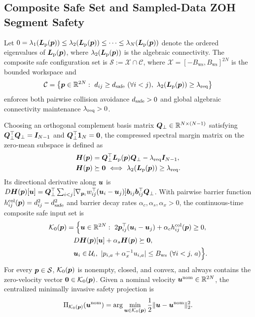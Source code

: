 \subsection{Composite Safe Set and Sampled-Data ZOH Segment Safety}
Let $0=\lambda_1(\boldsymbol{L}_{\mathrm{p}}(\boldsymbol{p}))\le\lambda_2(\boldsymbol{L}_{\mathrm{p}}(\boldsymbol{p}))\le\cdots\le\lambda_N(\boldsymbol{L}_{\mathrm{p}}(\boldsymbol{p}))$ denote the ordered eigenvalues of $\boldsymbol{L}_{\mathrm{p}}(\boldsymbol{p})$, where $\lambda_2(\boldsymbol{L}_{\mathrm{p}}(\boldsymbol{p}))$ is the algebraic connectivity. The composite safe configuration set is $\mathcal S:=\mathcal X\cap\mathcal C$, where $\mathcal X=[-B_{\mathrm{ws}},B_{\mathrm{ws}}]^{2N}$ is the bounded workspace and
\begin{equation}
 \mathcal C=\big\{\bp\in\mathbb R^{2N}:\ d_{ij}\ge\ds\ (\forall i<j),\ \lambda_2(\bL(\bp))\ge\lr\big\}
 \label{eq:safe-set}
\end{equation}
enforces both pairwise collision avoidance $d_{\mathrm{safe}}>0$ and global algebraic connectivity maintenance $\lambda_{\mathrm{req}}>0$.

Choosing an orthogonal complement basis matrix $\boldsymbol{Q}_\perp\in\mathbb R^{N\times(N-1)}$ satisfying $\boldsymbol{Q}_\perp^{\top}\boldsymbol{Q}_\perp=\boldsymbol{I}_{N-1}$ and $\boldsymbol{Q}_\perp^{\top}\boldsymbol 1_N=\boldsymbol 0$, the compressed spectral margin matrix on the zero-mean subspace is defined as
\begin{equation}
\begin{split}
 \bH(\bp)&=\bQ^{\top}\bL(\bp)\bQ-\lr\I_{N-1},\\
 \bH(\bp)&\succeq\boldsymbol 0\ \Longleftrightarrow\ \lambda_2(\bL(\bp))\ge\lr.
\end{split}\label{eq:H-matrix}
\end{equation}
Its directional derivative along $\boldsymbol{u}$ is $D\boldsymbol{H}(\boldsymbol{p})[\boldsymbol{u}]=\boldsymbol{Q}_\perp^{\top}\sum_{i<j}[\nabla_{\boldsymbol{p}_i}w_{ij}^{\top}(\boldsymbol{u}_i-\boldsymbol{u}_j)]\boldsymbol b_{ij}\boldsymbol b_{ij}^{\top}\boldsymbol{Q}_\perp$. With pairwise barrier function $h_{ij}^{\mathrm{col}}(\boldsymbol{p})=d_{ij}^2-d_{\mathrm{safe}}^2$ and barrier decay rates $\alpha_c,\alpha_s,\alpha_x>0$, the continuous-time composite safe input set is
\begin{equation}
\begin{split}
 \mathcal K_0(\bp)&=\Big\{\bu\in\mathbb R^{2N}:\ 2\bp_{ij}^{\top}(\bu_i-\bu_j)+\alpha_c h_{ij}^{\mathrm{col}}(\bp)\ge 0,\\
 &\quad D\bH(\bp)[\bu]+\alpha_s\bH(\bp)\succeq\boldsymbol 0,\\
 &\quad \bu_i\in\mathcal U_i,\ |p_{i,a}+\alpha_x^{-1}u_{i,a}|\le B_{\mathrm{ws}}\ (\forall i<j,\,a)\Big\}.
\end{split}\label{eq:K0-def}
\end{equation}
For every $\boldsymbol{p}\in\mathcal S$, $\mathcal K_0(\boldsymbol{p})$ is nonempty, closed, and convex, and always contains the zero-velocity vector $\boldsymbol 0\in\mathcal K_0(\boldsymbol{p})$. Given a nominal velocity $\boldsymbol{u}^{\mathrm{nom}}\in\mathbb R^{2N}$, the centralized minimally invasive safety projection is
\begin{equation}
 \Pi_{\mathcal K_0(\boldsymbol{p})}(\boldsymbol{u}^{\mathrm{nom}})=\arg\min_{\boldsymbol{u}\in\mathcal K_0(\boldsymbol{p})}\frac12\lVert\boldsymbol{u}-\boldsymbol{u}^{\mathrm{nom}}\rVert_2^2.
 \label{eq:central-proj}
\end{equation}

